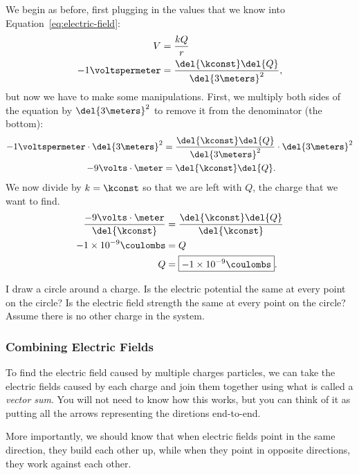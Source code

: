 \documentclass[12pt,paper=letter]{scrartcl}
\begin{document}
    We begin as before, first plugging in the values that we know into Equation~\ref{eq:electric-field}:
    \begin{align*}
        V&=\frac{kQ}{r}\\
        -1\voltspermeter&=\frac{\del{\kconst}\del{Q}}{\del{3 \meters}^2},
    \end{align*}
    but now we have to make some manipulations.
    First, we multiply both sides of the equation by $\del{3\meters}^2$ to remove it from the denominator (the bottom):
    \begin{align*}
        -1\voltspermeter\cdot \del{3\meters}^2&=\frac{\del{\kconst}\del{Q}}{\del{3\meters}^2}\cdot \del{3\meters}^2\\
        -9 \volts\cdot\meter&=\del{\kconst}\del{Q}.
    \end{align*}
    We now divide by $k=\kconst$ so that we are left with $Q$,
    the charge that we want to find.
    \begin{align*}
        \frac{-9 \volts\cdot\meter}{\del{\kconst}}&=\frac{\del{\kconst}\del{Q}}{\del{\kconst}}\\
        -1\times 10^{-9} \coulombs &= Q\\
        Q &= \boxed{-1\times 10^{-9} \coulombs}.
    \end{align*}

    \begin{exrboxed}
        I draw a circle around a charge.
        Is the electric potential the same at every point on the circle?
        Is the electric field strength the same at every point on the circle?
        Assume there is no other charge in the system.
        \hints{\ref{hint:circle1}, \ref{hint:circle2}}
    \end{exrboxed}

    \subsubsection{Combining Electric Fields}
    To find the electric field caused by multiple charges particles,
    we can take the electric fields caused by each charge and join them together using what is called a \emph{vector sum}.
    You will not need to know how this works, but you can think of it as putting all the arrows representing the diretions end-to-end.

    
    \pnp
    More importantly, we should know that when electric fields point in the same direction, they build each other up,
    while when they point in opposite directions, they work against each other.
\end{document}
